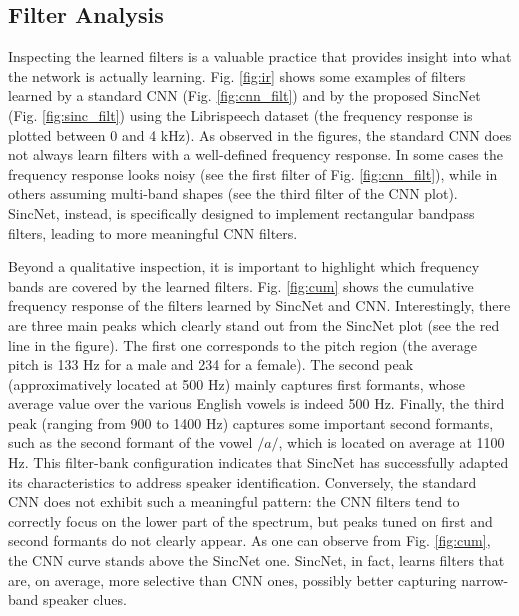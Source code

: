 \documentclass{article}
\begin{document}
\subsection{Filter Analysis}
Inspecting the learned filters is a valuable practice that provides insight into what the network is actually learning.
Fig. \ref{fig:ir} shows some examples of filters learned by a standard CNN (Fig. \ref{fig:cnn_filt}) and by the proposed SincNet (Fig. \ref{fig:sinc_filt}) using the Librispeech dataset (the frequency response is plotted between 0 and 4 kHz). As observed in the figures, the standard CNN does not always learn filters with a well-defined frequency response. In some cases the frequency response looks noisy (see the first filter of Fig. \ref{fig:cnn_filt}), while in others assuming  multi-band shapes (see the third filter of the CNN plot). SincNet, instead, is specifically designed to implement rectangular bandpass filters, leading to more meaningful CNN filters. 

Beyond a qualitative inspection, it is important to highlight which frequency bands are covered by the learned filters.
Fig. \ref{fig:cum} shows the cumulative frequency response of the filters learned by SincNet and CNN. Interestingly, there are three main peaks which clearly stand out from the SincNet plot (see the red line in the figure). The first one corresponds to the pitch region (the average pitch is 133 Hz for a male and 234 for a female). The second peak (approximatively located at 500 Hz) mainly captures first formants, whose average value over the various English vowels is indeed 500 Hz. Finally, the third peak (ranging from 900 to 1400 Hz) captures some important second formants, such as the second formant of the vowel $/a/$, which is located on average at 1100 Hz.
This filter-bank configuration indicates that SincNet has successfully adapted its characteristics to address speaker identification. Conversely, the standard CNN does not exhibit such a meaningful pattern: the CNN filters tend to correctly focus on the lower part of the spectrum, but peaks tuned on first and second formants do not clearly appear. As one can observe from Fig. \ref{fig:cum}, the CNN curve stands above the SincNet one. SincNet, in fact, learns filters that are, on average, more selective than CNN ones, possibly better capturing narrow-band speaker clues.

\end{document}
